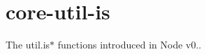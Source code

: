 \chapter{core-\/util-\/is}
\hypertarget{md_node__modules_2core-util-is_2README}{}\label{md_node__modules_2core-util-is_2README}
\label{md_node__modules_2core-util-is_2README_autotoc_md8295}%
%
 The {\ttfamily util.\+is\texorpdfstring{$\ast$}{*}} functions introduced in Node v0.. 